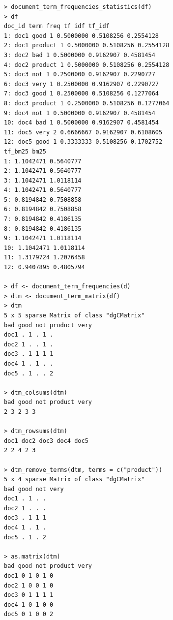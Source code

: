 \begin{verbatim}
> document_term_frequencies_statistics(df)
> df
doc_id term freq tf idf tf_idf
1: doc1 good 1 0.5000000 0.5108256 0.2554128
2: doc1 product 1 0.5000000 0.5108256 0.2554128
3: doc2 bad 1 0.5000000 0.9162907 0.4581454
4: doc2 product 1 0.5000000 0.5108256 0.2554128
5: doc3 not 1 0.2500000 0.9162907 0.2290727
6: doc3 very 1 0.2500000 0.9162907 0.2290727
7: doc3 good 1 0.2500000 0.5108256 0.1277064
8: doc3 product 1 0.2500000 0.5108256 0.1277064
9: doc4 not 1 0.5000000 0.9162907 0.4581454
10: doc4 bad 1 0.5000000 0.9162907 0.4581454
11: doc5 very 2 0.6666667 0.9162907 0.6108605
12: doc5 good 1 0.3333333 0.5108256 0.1702752
tf_bm25 bm25
1: 1.1042471 0.5640777
2: 1.1042471 0.5640777
3: 1.1042471 1.0118114
4: 1.1042471 0.5640777
5: 0.8194842 0.7508858
6: 0.8194842 0.7508858
7: 0.8194842 0.4186135
8: 0.8194842 0.4186135
9: 1.1042471 1.0118114
10: 1.1042471 1.0118114
11: 1.3179724 1.2076458
12: 0.9407895 0.4805794

> df <- document_term_frequencies(d)
> dtm <- document_term_matrix(df)
> dtm
5 x 5 sparse Matrix of class "dgCMatrix"
bad good not product very
doc1 . 1 . 1 .
doc2 1 . . 1 .
doc3 . 1 1 1 1
doc4 1 . 1 . .
doc5 . 1 . . 2

> dtm_colsums(dtm)
bad good not product very
2 3 2 3 3

> dtm_rowsums(dtm)
doc1 doc2 doc3 doc4 doc5
2 2 4 2 3

> dtm_remove_terms(dtm, terms = c("product"))
5 x 4 sparse Matrix of class "dgCMatrix"
bad good not very
doc1 . 1 . .
doc2 1 . . .
doc3 . 1 1 1
doc4 1 . 1 .
doc5 . 1 . 2

> as.matrix(dtm)
bad good not product very
doc1 0 1 0 1 0
doc2 1 0 0 1 0
doc3 0 1 1 1 1
doc4 1 0 1 0 0
doc5 0 1 0 0 2
\end{verbatim}




